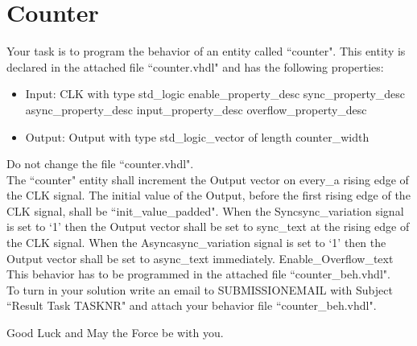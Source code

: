 \documentclass[a4paper,12pt]{article}
\begin{document}
\pagestyle{empty}
\setlength{\parindent}{0em}
\section*{\noindent Counter }
Your task is to program the behavior of an entity called ``counter". This entity is declared in the attached file ``counter.vhdl" and has the following properties:

\begin{itemize}
	\item Input: CLK with type std\_logic
	{{enable_property_desc}}
	{{sync_property_desc}}
	{{async_property_desc}}
	{{input_property_desc}}
	{{overflow_property_desc}}
	\item Output: Output with type std\_logic\_vector of length {{counter_width}}

\begin{center}
\end{center}

\end{itemize}


Do not change the file ``counter.vhdl".\\

The ``counter" entity shall increment the Output vector on {{every_a}} rising edge of the CLK signal. The initial value of the Output, before the first rising edge of the CLK signal, shall be ``{{init_value_padded}}". When the Sync{{sync_variation}} signal is set to `1' then the Output vector shall be set to {{sync_text}} at the rising edge of the CLK signal. When the Async{{async_variation}} signal is set to `1' then the Output vector shall be set to {{async_text}} immediately. {{Enable_Overflow_text}} \\

This behavior has to be programmed in the attached file ``counter\_beh.vhdl".\\


To turn in your solution write an email to {{SUBMISSIONEMAIL}} with Subject ``Result Task {{TASKNR}}" and attach your behavior file ``counter\_beh.vhdl".

\vspace{0.7cm}
Good Luck and May the Force be with you.
\end{document}
